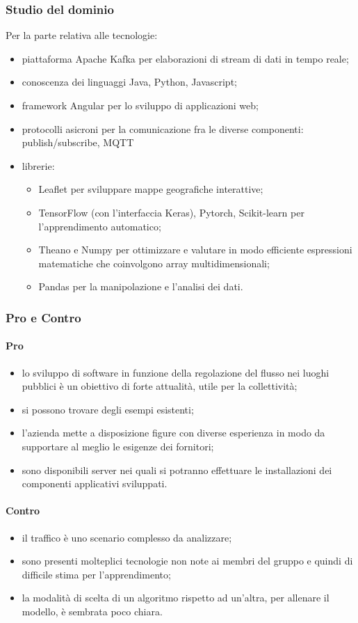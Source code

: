 \subsubsection{Studio del dominio}
Per la parte relativa alle tecnologie:
\begin{itemize}
	\item piattaforma Apache Kafka per elaborazioni di stream di dati in tempo reale;
	\item conoscenza dei linguaggi Java, Python, Javascript;
	\item framework Angular per lo sviluppo di applicazioni web;
	\item protocolli asicroni per la comunicazione fra le diverse componenti: publish/subscribe, MQTT 
	\item librerie:
	\begin{itemize}
		\item Leaflet per sviluppare mappe geografiche interattive;
		\item TensorFlow (con l'interfaccia Keras), Pytorch, Scikit-learn per l'apprendimento automatico; 
		\item Theano e Numpy per ottimizzare e valutare in modo efficiente espressioni matematiche che coinvolgono array multidimensionali;
		\item Pandas per la manipolazione e l'analisi dei dati.
	\end{itemize}
\end{itemize}
\subsubsection{Pro e Contro}
\paragraph*{Pro}
\begin{itemize}
\item lo sviluppo di software in funzione della regolazione del flusso nei luoghi pubblici è un obiettivo di forte attualità, utile per la collettività;
\item si possono trovare degli esempi esistenti;
\item l'azienda mette a disposizione figure con diverse esperienza in modo da supportare al meglio le esigenze dei fornitori;
\item sono disponibili server nei quali si potranno effettuare le installazioni dei componenti applicativi sviluppati.
\end{itemize}
\paragraph*{Contro}
\begin{itemize}
	\item il traffico è uno scenario complesso da analizzare;
	\item sono presenti molteplici tecnologie non note ai membri del gruppo e quindi di difficile stima per l'apprendimento;
	\item la modalità di scelta di un algoritmo rispetto ad un'altra, per allenare il modello, è sembrata poco chiara.
\end{itemize}
